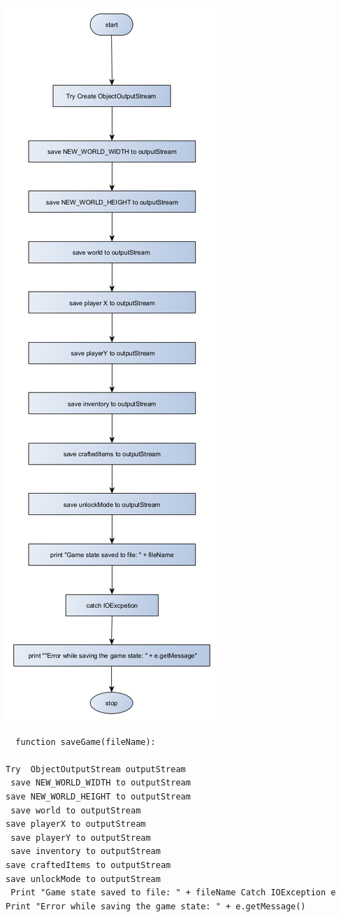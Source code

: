 {\includegraphics[height=\textheight]{../flowchart/saveGame.png}}

\begin{lstlisting}
  function saveGame(fileName):

Try  ObjectOutputStream outputStream
 save NEW_WORLD_WIDTH to outputStream 
save NEW_WORLD_HEIGHT to outputStream
 save world to outputStream 
save playerX to outputStream
 save playerY to outputStream
 save inventory to outputStream 
save craftedItems to outputStream 
save unlockMode to outputStream
 Print "Game state saved to file: " + fileName Catch IOException e 
Print "Error while saving the game state: " + e.getMessage() 

\end{lstlisting}
